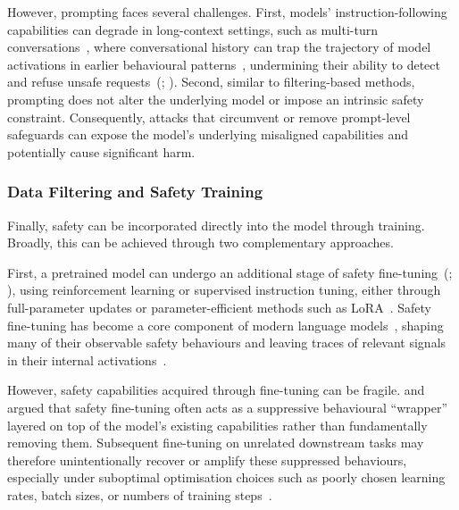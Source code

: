 However, prompting faces several challenges. First, models' instruction-following capabilities can degrade in long-context settings, such as multi-turn conversations~, where conversational history can trap the trajectory of model activations in earlier behavioural patterns~, undermining their ability to detect and refuse unsafe requests~(; ). Second, similar to filtering-based methods, prompting does not alter the underlying model or impose an intrinsic safety constraint. Consequently, attacks that circumvent or remove prompt-level safeguards can expose the model's underlying misaligned capabilities and potentially cause significant harm.

\subsubsection*{Data Filtering and Safety Training}

Finally, safety can be incorporated directly into the model through training. Broadly, this can be achieved through two complementary approaches.

First, a pretrained model can undergo an additional stage of safety fine-tuning~(; ), using reinforcement learning or supervised instruction tuning, either through full-parameter updates or parameter-efficient methods such as LoRA~. Safety fine-tuning has become a core component of modern language models~, shaping many of their observable safety behaviours and leaving traces of relevant signals in their internal activations~.

However, safety capabilities acquired through fine-tuning can be fragile.  and  argued that safety fine-tuning often acts as a suppressive behavioural ``wrapper'' layered on top of the model's existing capabilities rather than fundamentally removing them. Subsequent fine-tuning on unrelated downstream tasks may therefore unintentionally recover or amplify these suppressed behaviours, especially under
suboptimal optimisation choices such as poorly chosen learning rates,
batch sizes, or numbers of training steps~.


